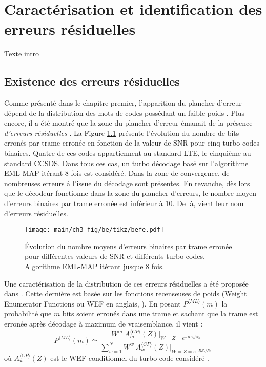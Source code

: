 \chapter{Caractérisation et identification des erreurs résiduelles} %

Texte intro

\vspace*{\fill}
\minitocTITI
\vspace*{\fill}
\newpage

\section{Existence des erreurs résiduelles}
Comme présenté dans le chapitre premier, l'apparition du plancher d'erreur dépend de la distribution des mots de codes 
possédant un faible poids \cite{distance_spectrum}. Plus encore, il a été montré que la zone du plancher d'erreur émanait 
de la présence \emph{d'erreurs résiduelles} \cite{takeshitaBCH}. 
La Figure \ref{fig:befe} présente l'évolution du nombre de bits erronés par trame erronée en fonction de la valeur de 
SNR pour cinq turbo codes binaires. Quatre de ces codes  appartiennent au standard LTE, le cinquième au standard CCSDS. 
Dans tous ces cas, un turbo décodage basé sur l'algorithme EML-MAP itérant 8 fois est considéré. Dans la zone de 
convergence, de nombreuses erreurs à l'issue du décodage sont présentes. En revanche, dès lors que le décodeur 
fonctionne dans la zone du plancher d'erreurs, le nombre moyen d'erreurs binaires par trame erronée est inférieur à 10. 
De là, vient leur nom d'erreurs résiduelles.

\begin{figure}[!b]
	\centering
	\texttt{[image: main/ch3\_fig/be/tikz/befe.pdf]}
	\caption{Évolution du nombre moyens d'erreurs binaires par trame erronée pour différentes valeurs de SNR et différents
	turbo codes. Algorithme EML-MAP itérant jusque 8 fois. \label{fig:befe}}
\end{figure}

Une caractérisation de la distribution de ces erreurs 
résiduelles a été proposée dans \cite{residual_errors}. Cette dernière est basée sur les fonctions recenseuses de poids
(Weight Enumerator Functions ou WEF en anglais, \cite{ryan}). En posant $P^{\langle ML\rangle}(m)$ la probabilité que 
$m$ bits soient erronés dans une trame et sachant que la trame est erronée après décodage à maximum de vraisemblance, il 
vient :
\begin{equation}
P^{\langle ML\rangle}(m) \simeq \frac{W^m~A_m^{\langle CP\rangle}(Z)\vert_{W=Z=e^{-RE_b/N_0}}}{\sum\limits_{w=1}^N W^w~A_w^{\langle CP\rangle}(Z) \vert_{W=Z=e^{-RE_b/N_0}}}
\label{eq:be1}
\end{equation}
où $A_w^{\langle CP\rangle}(Z)$ est le WEF conditionnel du turbo code considéré \cite{benedetto_unveiling}.

